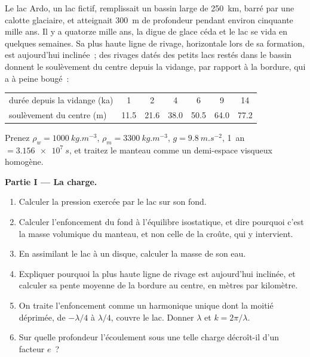 \begin{problem}
\label{pb:b3:mantle-convection:1}
Le lac Ardo, un lac fictif, remplissait un bassin large de \qty{250}{km}, barré par une
calotte glaciaire, et atteignait \qty{300}{m} de profondeur pendant environ cinquante mille ans. Il y a
quatorze mille ans, la digue de glace céda et le lac se vida en quelques semaines. Sa
plus haute ligne de rivage, horizontale lors de sa formation, est aujourd'hui inclinée~; des
rivages datés des petits lacs restés dans le bassin donnent le soulèvement du centre depuis la
vidange, par rapport à la bordure, qui a à peine bougé~:

\smallskip
\begin{center}\small
\begin{tabular}{lcccccc}
\hline
durée depuis la vidange (ka) & 1 & 2 & 4 & 6 & 9 & 14\\
soulèvement du centre (m) & 11.5 & 21.6 & 38.0 & 50.5 & 64.0 & 77.2\\
\hline
\end{tabular}
\end{center}
\smallskip

Prenez $\rho_w = \qty{1000}{kg.m^{-3}}$, $\rho_m = \qty{3300}{kg.m^{-3}}$, $g =
\qty{9.8}{m.s^{-2}}$, \qty{1}{an} $= \qty{3.156e7}{s}$, et traitez le manteau comme
un demi-espace visqueux homogène.

\medskip\noindent\textbf{Partie I --- La charge.}
\begin{enumerate}
  \item Calculer la pression exercée par le lac sur son fond.
  \item Calculer l'enfoncement du fond à l'équilibre isostatique, et dire
        pourquoi c'est la masse volumique du manteau, et non celle de la croûte, qui y intervient.
  \item En assimilant le lac à un disque, calculer la masse de son eau.
  \item Expliquer pourquoi la plus haute ligne de rivage est aujourd'hui inclinée, et calculer sa
        pente moyenne de la bordure au centre, en mètres par kilomètre.
  \item On traite l'enfoncement comme un harmonique unique dont la moitié déprimée, de
        $-\lambda/4$ à $\lambda/4$, couvre le lac. Donner $\lambda$ et $k =
        2\pi/\lambda$.
  \item Sur quelle profondeur l'écoulement sous une telle charge décroît-il d'un facteur
        $e$~?
\end{enumerate}


\end{problem}
